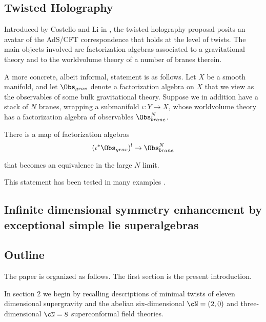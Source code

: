 \subsection{Twisted Holography}
Introduced by Costello and Li in \cite{CLsugra}, the twisted holography proposal posits an avatar of the AdS/CFT correspondence that holds at the level of twists. The main objects involved are factorization algebras associated to a gravitational theory and to the worldvolume theory of a number of branes therein.

A more concrete, albeit informal, statement is as follows. Let $X$ be a smooth manifold, and let $\Obs_{grav}$ denote a factorization algebra on $X$ that we view as the observables of some bulk gravitational theory. Suppose we in addition have a stack of $N$ branes, wrapping a submanifold $\iota: Y\to X$, whose worldvolume theory has a factorization algebra of observables $\Obs^{N}_{brane}$.

\begin{slogan}
  There is a map of factorization algebras
  \[
        (\iota^{*}\Obs_{grav})^{!}\to \Obs^{N}_{brane}
  \]

      that becomes an equivalence in the large $N$ limit.
\end{slogan}

    This statement has been tested in many examples \cite{}.


\subsection{Infinite dimensional symmetry enhancement by exceptional simple lie superalgebras}

\subsection{Outline}

The paper is organized as follows. The first section is the present introduction.

In section 2 we begin by recalling descriptions of minimal twists of eleven dimensional supergravity \cite{} and the abelian six-dimensional $\cN=(2,0)$ \cite{} and three-dimensional $\cN=8$ \cite{} superconformal field theories.

%
